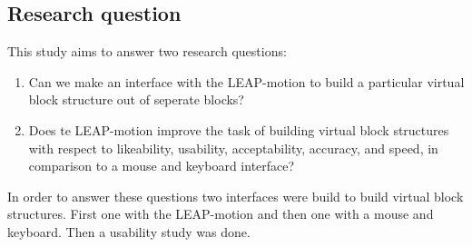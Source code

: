 \subsection{Research question}
This study aims to answer two research questions:
\begin{enumerate}
\item Can we make an interface with the LEAP-motion to build a particular virtual block structure out of seperate blocks?
\item Does te LEAP-motion improve the task of building virtual block structures with respect to likeability, usability, acceptability, accuracy, and speed, in comparison to a mouse and keyboard interface?
\end{enumerate}
In order to answer these questions two interfaces were build to build virtual block structures. First one with the LEAP-motion and then one with a mouse and keyboard. Then a usability study was done.